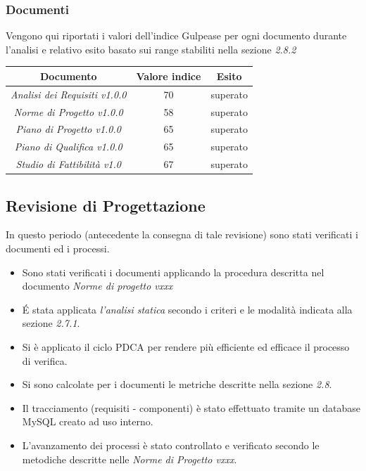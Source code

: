 {\subsubsection{Documenti}
Vengono qui riportati i valori dell’indice Gulpease per ogni documento durante l’analisi e relativo
esito basato sui range stabiliti nella sezione \emph{2.8.2}
\begin{center}
  \begin{tabular}{|c|c|c|}
    \hline
    \textbf{Documento} & \textbf{Valore indice} & \textbf{Esito} \\
    \hline
    \emph{Analisi dei Requisiti v1.0.0}  & 70 & superato \\
    \hline
    \emph{Norme di Progetto v1.0.0}   & 58  & superato \\
    \hline
    \emph{Piano di Progetto v1.0.0}   & 65 & superato \\
    \hline
    \emph{Piano di Qualifica v1.0.0}   & 65 & superato \\
    \hline
    \emph{Studio di Fattibilità v1.0}  & 67 & superato \\
    \hline
  \end{tabular}
  \end{center}

\subsection{Revisione di Progettazione}
In questo periodo (antecedente la consegna di tale revisione) sono stati verificati i documenti ed i processi.

\begin{itemize}
\item Sono stati verificati i documenti applicando la procedura descritta nel documento \emph{Norme di progetto vxxx}
\item \'E stata applicata \emph{l'analisi statica} secondo i criteri e le modalità indicata alla sezione \emph{2.7.1}. 
\item Si è applicato il ciclo PDCA per rendere più efficiente ed efficace il processo di verifica.
\item Si sono calcolate per i documenti le metriche descritte nella sezione \emph{2.8}.
\item Il tracciamento (requisiti - componenti) è stato effettuato tramite un database MySQL creato ad uso interno.
\item L’avanzamento dei processi è stato controllato e verificato secondo le metodiche descritte nelle \emph{Norme di Progetto vxxx}.


\end{itemize}}
